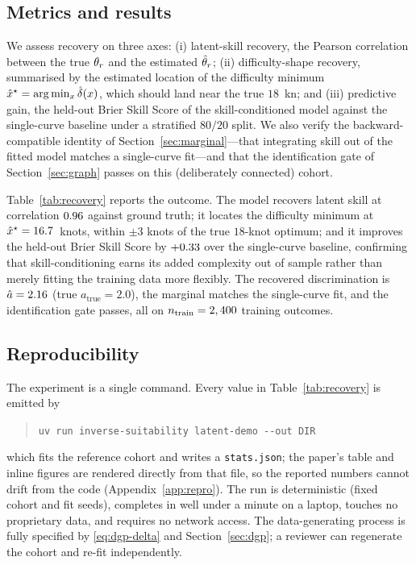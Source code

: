 \subsection{Metrics and results}

We assess recovery on three axes: (i) latent-skill recovery, the Pearson
correlation between the true $\theta_r$ and the estimated $\hat{\theta}_r$;
(ii) difficulty-shape recovery, summarised by the estimated location of the
difficulty minimum $\hat{x}^\star = \arg\min_x \hat{\delta}(x)$,
which should land near the true $18$~kn; and (iii) predictive gain, the held-out
Brier Skill Score of the skill-conditioned model against the single-curve
baseline under a stratified $80/20$ split. We also verify the backward-compatible
identity of Section~\ref{sec:marginal}---that integrating skill out of the fitted
model matches a single-curve fit---and that the identification gate of
Section~\ref{sec:graph} passes on this (deliberately connected) cohort.

Table~\ref{tab:recovery} reports the outcome. The model recovers latent skill at
correlation $0.96$ against ground truth; it locates the difficulty
minimum at $\hat{x}^\star = 16.7$~knots, within $\pm 3$ knots of
the true $18$-knot optimum; and it improves the held-out Brier Skill Score by
$+0.33$ over the single-curve baseline, confirming that
skill-conditioning earns its added complexity out of sample rather than merely
fitting the training data more flexibly. The recovered discrimination is
$\hat{a} = 2.16$ (true $a_{\text{true}} = 2.0$), the marginal matches
the single-curve fit, and the identification gate passes, all on
$n_{\text{train}} = 2,400$ training outcomes.

\subsection{Reproducibility}
\label{sec:repro}

The experiment is a single command. Every value in Table~\ref{tab:recovery} is
emitted by
\begin{quote}
  \verb|uv run inverse-suitability latent-demo --out DIR|
\end{quote}
which fits the reference cohort and writes a \texttt{stats.json}; the paper's
table and inline figures are rendered directly from that file, so the reported
numbers cannot drift from the code (Appendix~\ref{app:repro}). The run is
deterministic (fixed cohort and fit seeds), completes in well under a minute on a
laptop, touches no proprietary data, and requires no network access. The
data-generating process is fully specified by \eqref{eq:dgp-delta} and
Section~\ref{sec:dgp}; a reviewer can regenerate the cohort and re-fit
independently.
